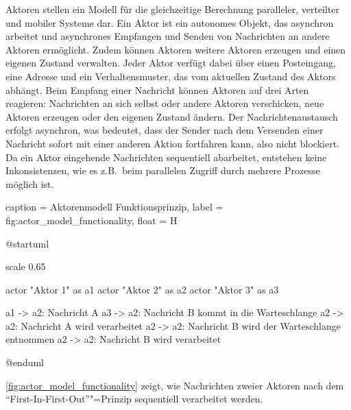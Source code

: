 Aktoren stellen ein Modell für die gleichzeitige Berechnung paralleler, verteilter und mobiler Systeme dar.
Ein Aktor ist ein autonomes Objekt, das asynchron arbeitet und asynchrones Empfangen und Senden von Nachrichten an andere Aktoren ermöglicht.
Zudem können Aktoren weitere Aktoren erzeugen und einen eigenen Zustand verwalten.
Jeder Aktor verfügt dabei über einen Posteingang, eine Adresse und ein Verhaltensmuster, das vom aktuellen Zustand des Aktors abhängt.
Beim Empfang einer Nachricht können Aktoren auf drei Arten reagieren:
Nachrichten an sich selbst oder andere Aktoren verschicken, neue Aktoren erzeugen oder den eigenen Zustand ändern.
Der Nachrichtenaustausch erfolgt asynchron, was bedeutet, dass der Sender nach dem Versenden einer Nachricht sofort mit einer anderen Aktion fortfahren kann, also nicht blockiert.
Da ein Aktor eingehende Nachrichten sequentiell abarbeitet, entstehen keine Inkonsistenzen, wie es z.B.\ beim parallelen Zugriff durch mehrere Prozesse möglich ist.

\begin{dhbwfigure}{%
    caption	= Aktorenmodell Funktionsprinzip,
    label	= fig:actor_model_functionality,
    float   = H
}
\begin{plantuml}
@startuml

scale 0.65

actor "Aktor 1" as a1
actor "Aktor 2" as a2
actor "Aktor 3" as a3

a1 -> a2: Nachricht A
a3 -> a2: Nachricht B kommt in die Warteschlange
a2 -> a2: Nachricht A wird verarbeitet
a2 -> a2: Nachricht B wird der Warteschlange entnommen
a2 -> a2: Nachricht B wird verarbeitet

@enduml
\end{plantuml}
\end{dhbwfigure}

\autoref{fig:actor_model_functionality} zeigt, wie Nachrichten zweier Aktoren nach dem \enquote{First-In-First-Out}"=Prinzip sequentiell verarbeitet werden.
